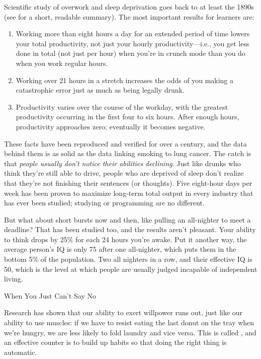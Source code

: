 Scientific study of overwork and sleep deprivation goes back to at
least the 1890s (see \cite{Robi2005} for a short, readable summary).
The most important results for learners are:

\begin{enumerate}

\item Working more than eight hours a day for an extended period of
  time lowers your total productivity, not just your hourly
  productivity---i.e., you get less done in total (not just per hour)
  when you're in crunch mode than you do when you work regular hours.

\item Working over 21 hours in a stretch increases the odds of you
  making a catastrophic error just as much as being legally drunk.

\item Productivity varies over the course of the workday, with the
  greatest productivity occurring in the first four to six hours.
  After enough hours, productivity approaches zero; eventually it
  becomes negative.

\end{enumerate}

These facts have been reproduced and verified for over a century, and
the data behind them is as solid as the data linking smoking to lung
cancer.  The catch is that \emph{people usually don't notice their
  abilities declining}.  Just like drunks who think they're still able
to drive, people who are deprived of sleep don't realize that they're
not finishing their sentences (or thoughts).  Five eight-hour days per
week has been proven to maximize long-term total output in every
industry that has ever been studied; studying or programming are no
different.

But what about short bursts now and then, like pulling an all-nighter
to meet a deadline?  That has been studied too, and the results aren't
pleasant.  Your ability to think drops by 25\% for each 24 hours
you're awake.  Put it another way, the average person's IQ is only 75
after one all-nighter, which puts them in the bottom 5\% of the
population.  Two all nighters in a row, and their effective IQ is 50,
which is the level at which people are usually judged incapable of
independent living.

\begin{callout}{When You Just Can't Say No}

  Research has shown that our ability to exert willpower runs out,
  just like our ability to use muscles: if we have to resist eating
  the last donut on the tray when we're hungry, we are less likely to
  fold laundry and vice versa.  This is called
   \cite{Mill2016a}, and an
  effective counter is to build up habits so that doing the right
  thing is automatic.

\end{callout}

